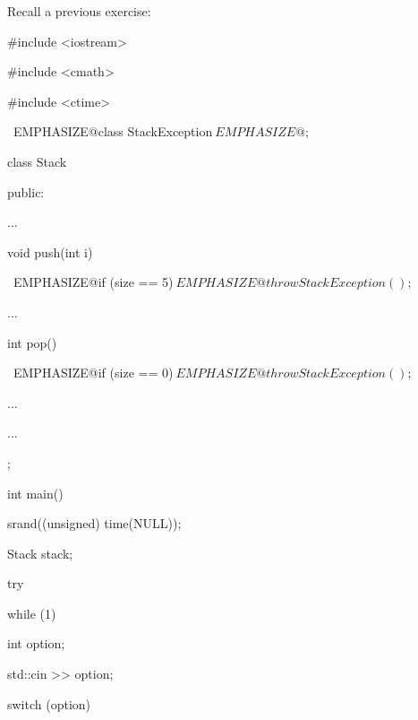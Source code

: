 Recall a previous exercise:



\begin{console}[commandchars=\~\@\$]

#include <iostream>

#include <cmath>

#include <ctime>



~EMPHASIZE@class StackException$

~EMPHASIZE@{};$



class Stack

{     

public:

      ...

      void push(int i)

      {    

           ~EMPHASIZE@if (size == 5)$

                 ~EMPHASIZE@throw StackException();$

           ...

      }

      int pop()

      {   

          ~EMPHASIZE@if (size == 0)$

                 ~EMPHASIZE@throw StackException();$

          ...

      }

  ...

};







int main()

{   

    srand((unsigned) time(NULL));

    Stack stack;



    try

    {   

        while (1)

        {     

              int option;

              std::cin >> option;

              switch (option)

              {

}}}}
\end{console}
